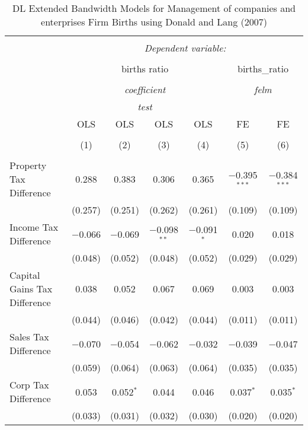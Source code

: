 
\begin{table}[!htbp] \centering 
  \caption{DL Extended Bandwidth Models for  Management of companies and enterprises Firm Births using Donald and Lang (2007)} 
  \label{} 
\begin{tabular}{@{\extracolsep{5pt}}lcccccc} 
\\[-1.8ex]\hline 
\hline \\[-1.8ex] 
 & \multicolumn{6}{c}{\textit{Dependent variable:}} \\ 
\cline{2-7} 
\\[-1.8ex] & \multicolumn{4}{c}{births ratio} & \multicolumn{2}{c}{births\_ratio} \\ 
\\[-1.8ex] & \multicolumn{4}{c}{\textit{coefficient}} & \multicolumn{2}{c}{\textit{felm}} \\ 
 & \multicolumn{4}{c}{\textit{test}} & \multicolumn{2}{c}{\textit{}} \\ 
 & OLS & OLS & OLS & OLS & FE & FE \\ 
\\[-1.8ex] & (1) & (2) & (3) & (4) & (5) & (6)\\ 
\hline \\[-1.8ex] 
 Property Tax Difference & 0.288 & 0.383 & 0.306 & 0.365 & $-$0.395$^{***}$ & $-$0.384$^{***}$ \\ 
  & (0.257) & (0.251) & (0.262) & (0.261) & (0.109) & (0.109) \\ 
  Income Tax Difference & $-$0.066 & $-$0.069 & $-$0.098$^{**}$ & $-$0.091$^{*}$ & 0.020 & 0.018 \\ 
  & (0.048) & (0.052) & (0.048) & (0.052) & (0.029) & (0.029) \\ 
  Capital Gains Tax Difference & 0.038 & 0.052 & 0.067 & 0.069 & 0.003 & 0.003 \\ 
  & (0.044) & (0.046) & (0.042) & (0.044) & (0.011) & (0.011) \\ 
  Sales Tax Difference & $-$0.070 & $-$0.054 & $-$0.062 & $-$0.032 & $-$0.039 & $-$0.047 \\ 
  & (0.059) & (0.064) & (0.063) & (0.064) & (0.035) & (0.035) \\ 
  Corp Tax Difference & 0.053 & 0.052$^{*}$ & 0.044 & 0.046 & 0.037$^{*}$ & 0.035$^{*}$ \\ 
  & (0.033) & (0.031) & (0.032) & (0.030) & (0.020) & (0.020) \\ 

\end{tabular}
\end{table}
